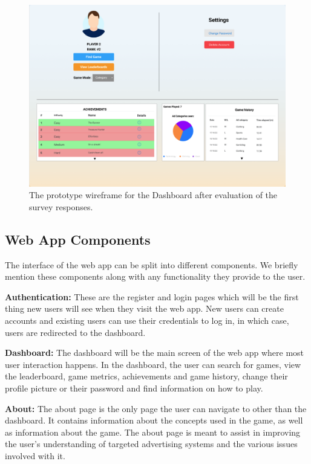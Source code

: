 \documentclass{l4proj}
\begin{document}
\begin{figure}
    \centering
    \includegraphics[width=1\linewidth]{images/DashboardFinal.png}    

    \caption{The prototype wireframe for the Dashboard after evaluation of the survey responses. }

    \label{fig:finaldesign} 
\end{figure}

\subsection{Web App Components}
The interface of the web app can be split into different components. We briefly mention these components along with any functionality they provide to the user.

\textbf{Authentication:} These are the register and login pages which will be the first thing new users will see when they visit the web app. New users can create accounts and existing users can use their credentials to log in, in which case, users are redirected to the dashboard.

\textbf{Dashboard:} The dashboard will be the main screen of the web app where most user interaction happens. In the dashboard, the user can search for games, view the leaderboard, game metrics, achievements and game history, change their profile picture or their password and find information on how to play.

\textbf{About:} The about page is the only page the user can navigate to other than the dashboard. It contains information about the concepts used in the game, as well as information about the game. The about page is meant to assist in improving the user's understanding of targeted advertising systems and the various issues involved with it. 
\end{document}
